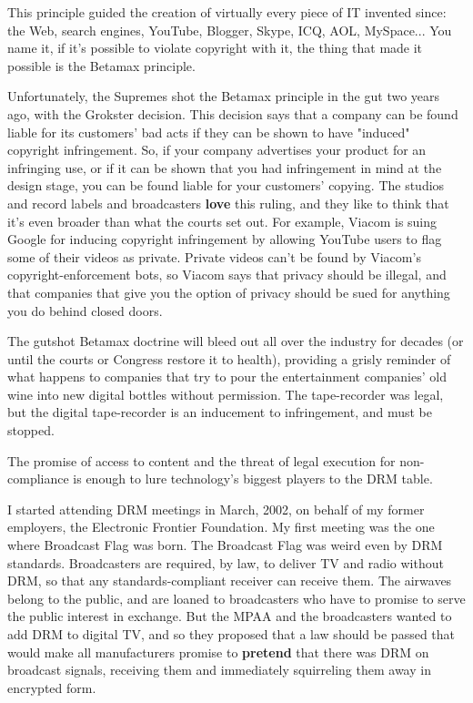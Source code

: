 This principle guided the creation of virtually every piece of IT
invented since: the Web, search engines, YouTube, Blogger, Skype,
ICQ, AOL, MySpace... You name it, if it's possible to violate
copyright with it, the thing that made it possible is the Betamax
principle.

Unfortunately, the Supremes shot the Betamax principle in the gut
two years ago, with the Grokster decision. This decision says that
a company can be found liable for its customers' bad acts if they
can be shown to have "induced" copyright infringement. So, if your
company advertises your product for an infringing use, or if it can
be shown that you had infringement in mind at the design stage, you
can be found liable for your customers' copying. The studios and
record labels and broadcasters \textbf{love} this ruling, and they
like to think that it's even broader than what the courts set out.
For example, Viacom is suing Google for inducing copyright
infringement by allowing YouTube users to flag some of their videos
as private. Private videos can't be found by Viacom's
copyright-enforcement bots, so Viacom says that privacy should be
illegal, and that companies that give you the option of privacy
should be sued for anything you do behind closed doors.

The gutshot Betamax doctrine will bleed out all over the industry
for decades (or until the courts or Congress restore it to health),
providing a grisly reminder of what happens to companies that try
to pour the entertainment companies' old wine into new digital
bottles without permission. The tape-recorder was legal, but the
digital tape-recorder is an inducement to infringement, and must be
stopped.

The promise of access to content and the threat of legal execution
for non-compliance is enough to lure technology's biggest players
to the DRM table.

I started attending DRM meetings in March, 2002, on behalf of my
former employers, the Electronic Frontier Foundation. My first
meeting was the one where Broadcast Flag was born. The Broadcast
Flag was weird even by DRM standards. Broadcasters are required, by
law, to deliver TV and radio without DRM, so that any
standards-compliant receiver can receive them. The airwaves belong
to the public, and are loaned to broadcasters who have to promise
to serve the public interest in exchange. But the MPAA and the
broadcasters wanted to add DRM to digital TV, and so they proposed
that a law should be passed that would make all manufacturers
promise to \textbf{pretend} that there was DRM on broadcast
signals, receiving them and immediately squirreling them away in
encrypted form.

